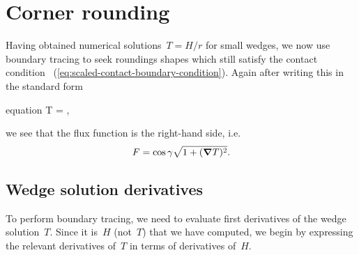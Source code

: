 \begin{figure}
\end{figure}

\section{Corner rounding}
\label{sec:small.rounding}

Having obtained numerical solutions~$T = H / r$ for small wedges,
we now use boundary tracing to seek roundings shapes
which still satisfy the contact condition~%
  (\ref{eq:scaled-contact-boundary-condition}).
Again after writing this in the standard form
\begin{important}{equation}
  \normalvec \dotp \del T = \cos\gamma {},
  \label{eq:small-flux-boundary-condition}
\end{important}
we see that the flux function is the right-hand side, i.e.
\begin{equation}
  F = \cos\gamma \sqrt{1 + (\mathop{}\!\boldsymbol{\mathbf{\nabla}} T)^2}.
  \label{eq:small-flux-function}
\end{equation}

\subsection{Wedge solution derivatives}
\label{sec:small.rounding.derivatives}

To perform boundary tracing,
we need to evaluate first derivatives of the wedge solution~$T$.
Since it is~$H$ (not~$T$) that we have computed,
we begin by expressing the relevant derivatives of~$T$
in terms of derivatives of~$H$.

